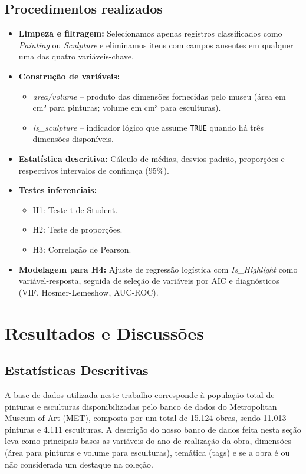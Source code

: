 \documentclass[11pt,a4paper]{article}
\begin{document}
\subsection{Procedimentos realizados}
\begin{itemize}
    \item \textbf{Limpeza e filtragem:} Selecionamos apenas registros classificados como \textit{Painting} ou \textit{Sculpture} e eliminamos itens com campos ausentes em qualquer uma das quatro variáveis-chave.
    \item \textbf{Construção de variáveis:}
        \begin{itemize}
            \item \textit{area/volume} – produto das dimensões fornecidas pelo museu (área em cm² para pinturas; volume em cm³ para esculturas).
            \item \textit{is\_sculpture} – indicador lógico que assume \texttt{TRUE} quando há três dimensões disponíveis.
        \end{itemize}
    \item \textbf{Estatística descritiva:} Cálculo de médias, desvios-padrão, proporções e respectivos intervalos de confiança (95\%).
    \item \textbf{Testes inferenciais:}
        \begin{itemize}
            \item H1: Teste t de Student.
            \item H2: Teste de proporções.
            \item H3: Correlação de Pearson.
        \end{itemize}
    \item \textbf{Modelagem para H4:} Ajuste de regressão logística com \textit{Is\_Highlight} como variável-resposta, seguida de seleção de variáveis por AIC e diagnósticos (VIF, Hosmer-Lemeshow, AUC-ROC).
\end{itemize}


\section{Resultados e Discussões}

\subsection{Estatísticas Descritivas}
A base de dados utilizada neste trabalho corresponde à população total de pinturas e esculturas disponibilizadas pelo banco de dados do Metropolitan Museum of Art (MET), composta por um total de 15.124 obras, sendo 11.013 pinturas e 4.111 esculturas. A descrição do nosso banco de dados feita nesta seção leva como principais bases as variáveis do ano de realização da obra, dimensões (área para pinturas e volume para esculturas), temática (tags) e se a obra é ou não considerada um destaque na coleção.
\end{document}
